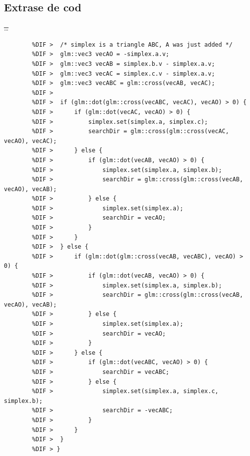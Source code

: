 \documentclass[12pt,a4paper]{report}
\providecommand{\DIFdeltex}[1]{{\protect\color{red}\sout{#1}}}                      %
\providecommand{\DIFaddbegin}{} %
\providecommand{\DIFdelbegin}{} %
\providecommand{\DIFdelend}{} %
\providecommand{\DIFdel}[1]{\texorpdfstring{\DIFdeltex{#1}}{}} %
\newcommand{\DIFscaledelfig}{0.5}
\newlength{\DIFdelgraphicswidth} %
\newlength{\DIFdelgraphicsheight} %
\newcommand{\DIFaddincludegraphics}[2][]{{\color{blue}\fbox{\DIFOincludegraphics[#1]{#2}}}} %
\newcommand{\DIFdelincludegraphics}[2][]{%
	\sbox{\DIFdelgraphicsbox}{\DIFOincludegraphics[#1]{#2}}%
	\settoboxwidth{\DIFdelgraphicswidth}{\DIFdelgraphicsbox} %
	\settoboxtotalheight{\DIFdelgraphicsheight}{\DIFdelgraphicsbox} %
	\scalebox{\DIFscaledelfig}{%
		\parbox[b]{\DIFdelgraphicswidth}{\usebox{\DIFdelgraphicsbox}\\[-\baselineskip] \rule{\DIFdelgraphicswidth}{0em}}\llap{\resizebox{\DIFdelgraphicswidth}{\DIFdelgraphicsheight}{%
				\setlength{\unitlength}{\DIFdelgraphicswidth}%
				\begin{picture}(1,1)%
				\thicklines\linethickness{2pt} %
				{\color[rgb]{1,0,0}\put(0,0){\framebox(1,1){}}}%
				{\color[rgb]{1,0,0}\put(0,0){\line( 1,1){1}}}%
				{\color[rgb]{1,0,0}\put(0,1){\line(1,-1){1}}}%
				\end{picture}%
			}\hspace*{3pt}}} %
} %
\DeclareRobustCommand{\DIFaddbegin}{\DIFOaddbegin \let\includegraphics\DIFaddincludegraphics} %
\DeclareRobustCommand{\DIFdelbegin}{\DIFOdelbegin \let\includegraphics\DIFdelincludegraphics} %
\DeclareRobustCommand{\DIFdelend}{\DIFOaddend \let\includegraphics\DIFOincludegraphics} %
\begin{document}
	\DIFdelend \begin{appendices}
		
		\chapter{Extrase de cod} %
		\DIFdelbegin \DIFdel{\ldots
		}\DIFdelend \DIFaddbegin \begin{lstlisting}[style={myC++}, caption = {Cazul triunghi în algoritmul GJK}, label={code:gjk_simplex3},alsolanguage=DIFcode]
		%DIF > void GJKEPA::GJKEPACollisionPointGenerator::doSimplex3() {
		%DIF > 	/* simplex is a triangle ABC, A was just added */
		%DIF > 	glm::vec3 vecAO = -simplex.a.v;
		%DIF > 	glm::vec3 vecAB = simplex.b.v - simplex.a.v;
		%DIF > 	glm::vec3 vecAC = simplex.c.v - simplex.a.v;
		%DIF > 	glm::vec3 vecABC = glm::cross(vecAB, vecAC);
		%DIF > 	
		%DIF > 	if (glm::dot(glm::cross(vecABC, vecAC), vecAO) > 0) {
		%DIF > 		if (glm::dot(vecAC, vecAO) > 0) {
		%DIF > 			simplex.set(simplex.a, simplex.c);
		%DIF > 			searchDir = glm::cross(glm::cross(vecAC, vecAO), vecAC);
		%DIF > 		} else {
		%DIF > 			if (glm::dot(vecAB, vecAO) > 0) {
		%DIF > 				simplex.set(simplex.a, simplex.b);
		%DIF > 				searchDir = glm::cross(glm::cross(vecAB, vecAO), vecAB);
		%DIF > 			} else {
		%DIF > 				simplex.set(simplex.a);
		%DIF > 				searchDir = vecAO;
		%DIF > 			}
		%DIF > 		}
		%DIF > 	} else {
		%DIF > 		if (glm::dot(glm::cross(vecAB, vecABC), vecAO) > 0) {
		%DIF > 			if (glm::dot(vecAB, vecAO) > 0) {
		%DIF > 				simplex.set(simplex.a, simplex.b);
		%DIF > 				searchDir = glm::cross(glm::cross(vecAB, vecAO), vecAB);
		%DIF > 			} else {
		%DIF > 				simplex.set(simplex.a);
		%DIF > 				searchDir = vecAO;
		%DIF > 			}
		%DIF > 		} else {
		%DIF > 			if (glm::dot(vecABC, vecAO) > 0) {
		%DIF > 				searchDir = vecABC;
		%DIF > 			} else {
		%DIF > 				simplex.set(simplex.a, simplex.c, simplex.b);
		%DIF > 				searchDir = -vecABC;
		%DIF > 			}
		%DIF > 		}
		%DIF > 	}
		%DIF > }
		\end{lstlisting}
		

\end{appendices}
\end{document}
